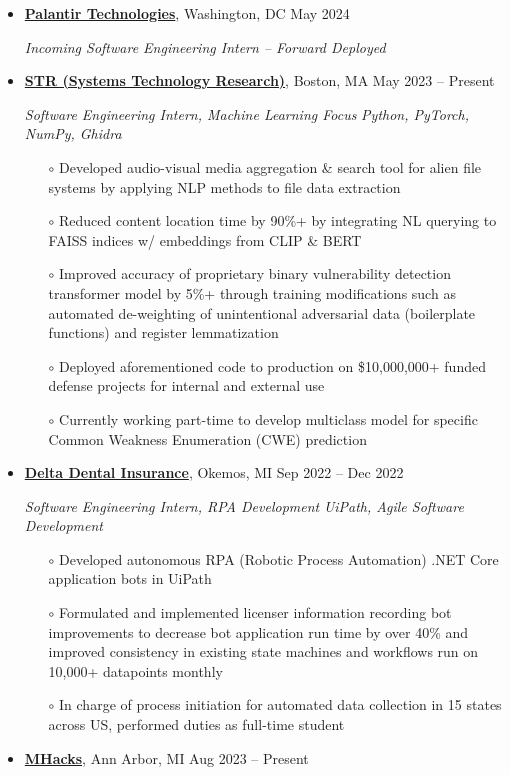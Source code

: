 \documentclass[10pt]{article}
\begin{document}
    \begin{itemize} 
        \item \href{https://www.palantir.com/} {\textbf{Palantir Technologies}}, Washington, DC \hfill May 2024
    
    \textit{Incoming Software Engineering Intern -- Forward Deployed}  \hfill \textit{}

        \item \href{https://www.str.us/} {\textbf{STR (Systems Technology Research)}}, Boston, MA \hfill May 2023 -- Present
    
    \textit{Software Engineering Intern, Machine Learning Focus}  \hfill \textit{Python, PyTorch, NumPy, Ghidra}
        \begin{itemize}[topsep=0pt]
          	\item[$\circ$] Developed audio-visual media aggregation \& search tool for alien file systems by applying NLP methods to file data extraction 
          	\item[$\circ$]  Reduced content location time by 90\%+ by integrating NL querying to FAISS indices w/ embeddings from CLIP \& BERT
          	\item[$\circ$]  Improved accuracy of proprietary binary vulnerability detection transformer model by 5\%+ through training modifications such as automated de-weighting of unintentional adversarial data (boilerplate functions) and register lemmatization
               \item[$\circ$]  Deployed aforementioned code to production on \$10,000,000+ funded defense projects for internal and external use
                \item[$\circ$]  Currently working part-time to develop multiclass model for specific Common Weakness Enumeration (CWE) prediction
        \end{itemize}
    \vspace{2pt}
    \item \href{https://www.deltadentalmi.com/} {\textbf{Delta Dental Insurance}}, Okemos, MI \hfill Sep 2022 -- Dec 2022
                  
      \textit{Software Engineering Intern, RPA Development}  \hfill \textit{UiPath, Agile Software Development}

        \begin{itemize}[topsep=0pt]   
            \item[$\circ$] Developed autonomous RPA (Robotic Process Automation) .NET Core application bots in UiPath
            \item[$\circ$] Formulated and implemented licenser information recording bot improvements to decrease bot application run time by over 40\% and improved consistency in existing state machines and workflows run on 10,000+ datapoints monthly
            \item[$\circ$] In charge of process initiation for automated data collection in 15 states across US, performed duties as full-time student
        \end{itemize}
    \vspace{2pt}
    \item \href{https://www.mhacks.org/} {\textbf{MHacks}}, Ann Arbor, MI \hfill Aug 2023 -- Present
                  

\end{itemize}
\end{document}
